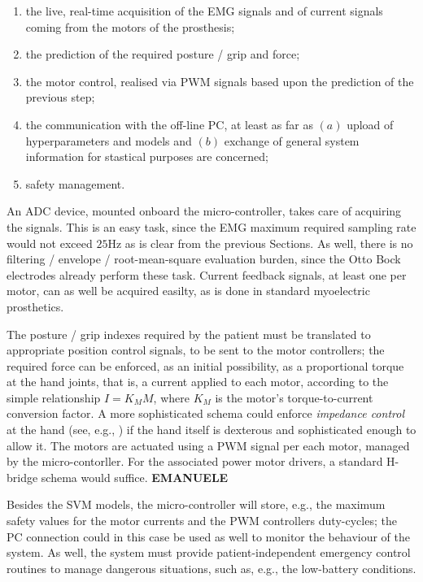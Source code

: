 \begin{enumerate}

  \item the live, real-time acquisition of the EMG signals and of
    current signals coming from the motors of the prosthesis;

  \item the prediction of the required posture / grip and force;

  \item the motor control, realised via PWM signals based upon the
    prediction of the previous step;

  \item the communication with the off-line PC, at least as far as
    $(a)$ upload of hyperparameters and models and $(b)$ exchange of
    general system information for stastical purposes are concerned;

  \item safety management.

\end{enumerate}

An ADC device, mounted onboard the micro-controller, takes care of
acquiring the signals. This is an easy task, since the EMG maximum
required sampling rate would not exceed $25$Hz as is clear from the
previous Sections. As well, there is no filtering / envelope /
root-mean-square evaluation burden, since the Otto Bock electrodes
already perform these task. Current feedback signals, at least one per
motor, can as well be acquired easilty, as is done in standard
myoelectric prosthetics.

The posture / grip indexes required by the patient must be translated
to appropriate position control signals, to be sent to the motor
controllers; the required force can be enforced, as an initial
possibility, as a proportional torque at the hand joints, that is, a
current applied to each motor, according to the simple relationship $I
= K_M M$, where $K_M$ is the motor's torque-to-current conversion
factor. A more sophisticated schema could enforce \emph{impedance
control} at the hand (see, e.g., \cite{alin}) if the hand itself is
dexterous and sophisticated enough to allow it. The motors are
actuated using a PWM signal per each motor, managed by the
micro-contorller. For the associated power motor drivers, a standard
H-bridge schema would suffice. \textbf{EMANUELE}

Besides the SVM models, the micro-controller will store, e.g., the
maximum safety values for the motor currents and the PWM controllers
duty-cycles; the PC connection could in this case be used as well to
monitor the behaviour of the system. As well, the system must provide
patient-independent emergency control routines to manage dangerous
situations, such as, e.g., the low-battery conditions.
